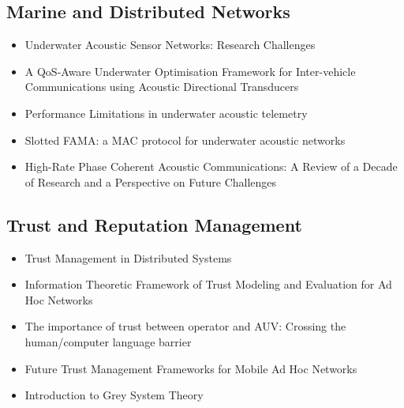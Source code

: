 \documentclass[twoside,9pt,a4paper]{Latex/Classes/PhDthesisPSnPDF}
\begin{document}
\subsection{Marine and Distributed Networks}
\begin{itemize}
  \item Underwater Acoustic Sensor Networks: Research Challenges
  \cite{Akyildiz2005}
  \item A QoS-Aware Underwater Optimisation Framework for Inter-vehicle
  Communications using Acoustic Directional Transducers \cite{Chen}
  \item Performance Limitations in underwater acoustic telemetry
  \cite{Catipovic1990}
  \item Slotted FAMA: a MAC protocol for underwater acoustic networks
  \cite{Molins2006}
  \item High-Rate Phase Coherent Acoustic Communications: A Review of a Decade
  of Research and a Perspective on Future Challenges \cite{Freitag2004}
\end{itemize}
\subsection{Trust and Reputation Management}
\begin{itemize}
  \item Trust Management in Distributed Systems \cite{Li2007}
  \item Information Theoretic Framework of Trust Modeling and Evaluation for Ad
  Hoc Networks \cite{Liu2006}
  \item The importance of trust between operator and AUV: Crossing the
  human/computer language barrier \cite{Johnson2007}
  \item Future Trust Management Frameworks for Mobile Ad Hoc Networks
  \cite{Li2008}
  \item Introduction to Grey System Theory \cite{Deng1989}
\end{itemize}





\end{document}
